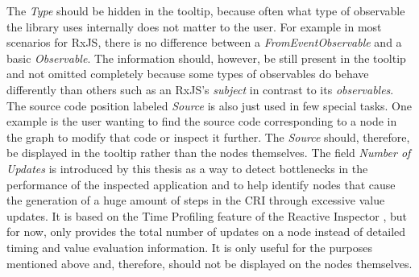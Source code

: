 The \emph{Type} should be hidden in the tooltip, because often what type of observable the library uses internally does not matter to the user. For example in most scenarios for RxJS, there is no difference between a \emph{FromEventObservable} and a basic \emph{Observable}. The information should, however, be still present in the tooltip and not omitted completely because some types of observables do behave differently than others such as an RxJS's \emph{subject} in contrast to its \emph{observables}. The source code position labeled \emph{Source} is also just used in few special tasks. One example is the user wanting to find the source code corresponding to a node in the graph to modify that code or inspect it further. The \emph{Source} should, therefore, be displayed in the tooltip rather than the nodes themselves. The field \emph{Number of Updates} is introduced by this thesis as a way to detect bottlenecks in the performance of the inspected application and to help identify nodes that cause the generation of a huge amount of steps in the CRI through excessive value updates. It is based on the Time Profiling feature of the Reactive Inspector \cite{ReactiveInspector}, but for now, only provides the total number of updates on a node instead of detailed timing and value evaluation information. It is only useful for the purposes mentioned above and, therefore, should not be displayed on the nodes themselves.

